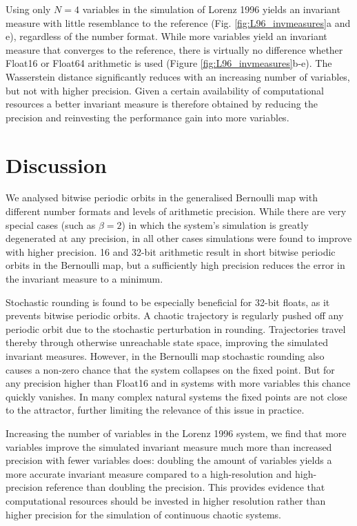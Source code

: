 Using only $N=4$ variables in the simulation of Lorenz 1996 yields an invariant measure with little resemblance to the reference (Fig.
\ref{fig:L96_invmeasures}a and e), regardless of the number format. While more variables yield an invariant measure that converges
to the reference, there is virtually no difference whether Float16 or Float64 arithmetic is used (Figure \ref{fig:L96_invmeasures}b-e).
The Wasserstein distance significantly reduces with an increasing number of variables, but not with higher precision. Given a certain
availability of computational resources a better invariant measure is therefore obtained by reducing the precision and reinvesting the
performance gain into more variables.

\section{Discussion}
\label{sec:orbits_discussion}

We analysed bitwise periodic orbits in the generalised Bernoulli map with different number formats and levels of arithmetic precision. 
While there are very special cases (such as $\beta = 2$) in which the system’s simulation is greatly degenerated at any precision,
in all other cases simulations were found to improve with higher precision. 16 and 32-bit arithmetic result in short bitwise periodic
orbits in the Bernoulli map, but a sufficiently high precision reduces the error in the invariant measure to a minimum. 

Stochastic rounding is found to be especially beneficial for 32-bit floats, as it prevents bitwise periodic orbits. A chaotic trajectory is
regularly pushed off any periodic orbit due to the stochastic perturbation in rounding. Trajectories travel thereby through otherwise
unreachable state space, improving the simulated invariant measures. However, in the Bernoulli map stochastic rounding also
causes a non-zero chance that the system collapses on the fixed point. But for any precision higher than Float16 and in systems
with more variables this chance quickly vanishes. In many complex natural systems the fixed points are not close to the attractor,
further limiting the relevance of this issue in practice.

Increasing the number of variables in the Lorenz 1996 system, we find that more variables improve the simulated invariant measure
much more than increased precision with fewer variables does: doubling the amount of variables yields a more accurate invariant
measure compared to a high-resolution and high-precision reference than doubling the precision. This provides evidence that
computational resources should be invested in higher resolution rather than higher precision for the simulation of continuous
chaotic systems.

